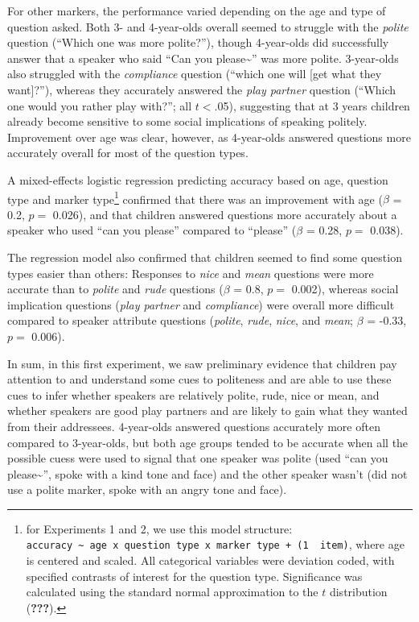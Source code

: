 \documentclass[10pt, letterpaper]{article}
\begin{document}
For other markers, the performance varied depending on the age and type
of question asked. Both 3- and 4-year-olds overall seemed to struggle
with the \emph{polite} question (``Which one was more polite?''), though
4-year-olds did successfully answer that a speaker who said ``Can you
please\textasciitilde{}'' was more polite. 3-year-olds also struggled
with the \emph{compliance} question (``which one will {[}get what they
want{]}?''), whereas they accurately answered the \emph{play partner}
question (``Which one would you rather play with?''; all \(t<\).05),
suggesting that at 3 years children already become sensitive to some
social implications of speaking politely. Improvement over age was
clear, however, as 4-year-olds answered questions more accurately
overall for most of the question types.

A mixed-effects logistic regression predicting accuracy based on age,
question type and marker type\footnote{for Experiments 1 and 2, we use
  this model structure:
  \texttt{accuracy\ \textasciitilde{}\ age\ x\ question\ type\ x\ marker\ type\ +\ (1\ \textbar{}\ item)},
  where age is centered and scaled. All categorical variables were
  deviation coded, with specified contrasts of interest for the question
  type. Significance was calculated using the standard normal
  approximation to the \(t\) distribution ({\textbf{???}}).} confirmed
that there was an improvement with age (\(\beta\) = 0.2, \(p =\) 0.026),
and that children answered questions more accurately about a speaker who
used ``can you please'' compared to ``please'' (\(\beta\) = 0.28,
\(p =\) 0.038).

The regression model also confirmed that children seemed to find some
question types easier than others: Responses to \emph{nice} and
\emph{mean} questions were more accurate than to \emph{polite} and
\emph{rude} questions (\(\beta\) = 0.8, \(p =\) 0.002), whereas social
implication questions (\emph{play partner} and \emph{compliance}) were
overall more difficult compared to speaker attribute questions
(\emph{polite}, \emph{rude}, \emph{nice}, and \emph{mean}; \(\beta\) =
-0.33, \(p =\) 0.006).

In sum, in this first experiment, we saw preliminary evidence that
children pay attention to and understand some cues to politeness and are
able to use these cues to infer whether speakers are relatively polite,
rude, nice or mean, and whether speakers are good play partners and are
likely to gain what they wanted from their addressees. 4-year-olds
answered questions accurately more often compared to 3-year-olds, but
both age groups tended to be accurate when all the possible cuess were
used to signal that one speaker was polite (used ``can you
please\textasciitilde{}'', spoke with a kind tone and face) and the
other speaker wasn't (did not use a polite marker, spoke with an angry
tone and face).
\end{document}
